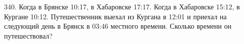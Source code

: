 340. Когда в Брянске 10:17, в Хабаровске 17:17. Когда в Хабаровске 15:12, в Кургане 10:12. Путешественник выехал из Кургана в 12:01 и приехал на следующий день в Брянск в 03:46 местного времени. Сколько времени он путешествовал?\\
